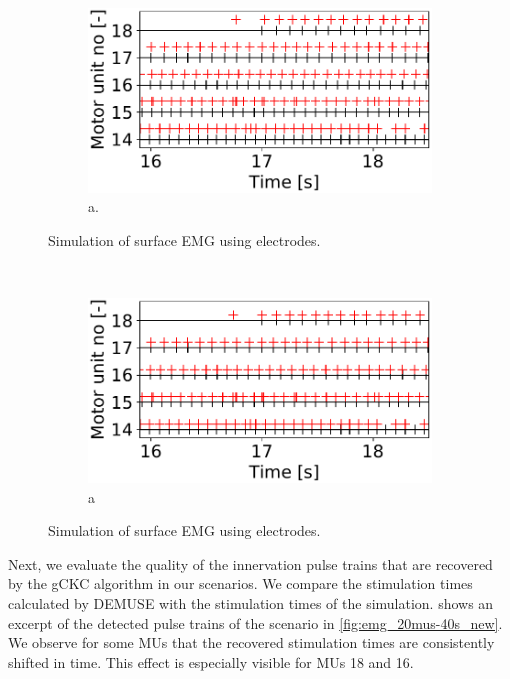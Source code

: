 \begin{figure}
  \centering%
  \begin{subfigure}[t]{0.47\textwidth}%
    \centering%
    \includegraphics[width=\textwidth]{images/results/application/emg_20mus-40s_new-noshift2.pdf}%
    \caption{a.}%
    \label{fig:newmus_nocorrection}%
  \end{subfigure}
  \caption{Simulation of surface EMG using electrodes.}%
  \label{fig:emg_video}\,
  \begin{subfigure}[t]{0.47\textwidth}%
    \centering%
    \includegraphics[width=\textwidth]{images/results/application/emg_20mus-40s_new-shift2.pdf}%
    \caption{a}%
    \label{fig:newmus_withcorrection}%
  \end{subfigure}
  \caption{Simulation of surface EMG using electrodes.}%
  \label{fig:newmus_shifting}%
\end{figure}

Next, we evaluate the quality of the innervation pulse trains that are recovered by the gCKC algorithm in our scenarios. We compare the stimulation times calculated by DEMUSE with the stimulation times of the simulation.  shows an excerpt of the detected pulse trains of the scenario in \cref{fig:emg_20mus-40s_new}. We observe for some MUs that the recovered stimulation times are consistently shifted in time. This effect is especially visible for MUs 18 and 16. 


